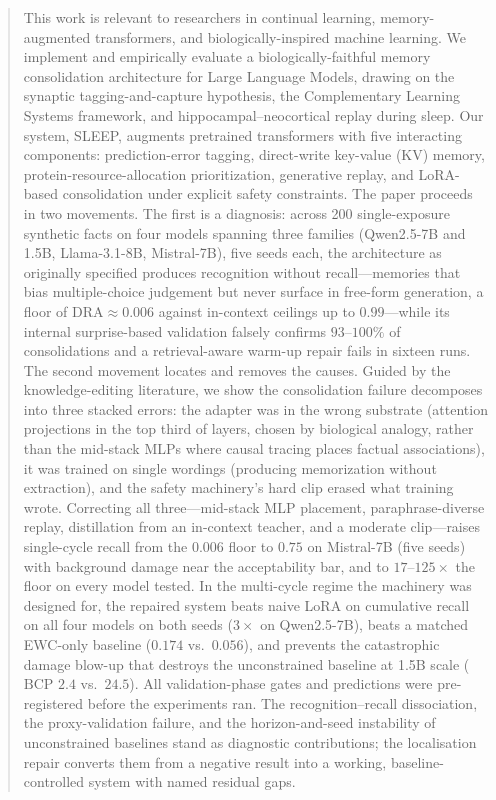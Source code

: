 
\begin{abstract}
This work is relevant to researchers in continual learning, memory-augmented transformers, and biologically-inspired machine learning. We implement and empirically evaluate a biologically-faithful memory consolidation architecture for Large Language Models, drawing on the synaptic tagging-and-capture hypothesis, the Complementary Learning Systems framework, and hippocampal--neocortical replay during sleep. Our system, SLEEP, augments pretrained transformers with five interacting components: prediction-error tagging, direct-write key-value (KV) memory, protein-resource-allocation prioritization, generative replay, and LoRA-based consolidation under explicit safety constraints. The paper proceeds in two movements. The first is a diagnosis: across 200 single-exposure synthetic facts on four models spanning three families (Qwen2.5-7B and 1.5B, Llama-3.1-8B, Mistral-7B), five seeds each, the architecture as originally specified produces recognition without recall---memories that bias multiple-choice judgement but never surface in free-form generation, a floor of $\mathrm{DRA} \approx 0.006$ against in-context ceilings up to $0.99$---while its internal surprise-based validation falsely confirms $93$--$100\%$ of consolidations and a retrieval-aware warm-up repair fails in sixteen runs. The second movement locates and removes the causes. Guided by the knowledge-editing literature, we show the consolidation failure decomposes into three stacked errors: the adapter was in the wrong substrate (attention projections in the top third of layers, chosen by biological analogy, rather than the mid-stack MLPs where causal tracing places factual associations), it was trained on single wordings (producing memorization without extraction), and the safety machinery's hard clip erased what training wrote. Correcting all three---mid-stack MLP placement, paraphrase-diverse replay, distillation from an in-context teacher, and a moderate clip---raises single-cycle recall from the $0.006$ floor to $0.75$ on Mistral-7B (five seeds) with background damage near the acceptability bar, and to $17$--$125\times$ the floor on every model tested. In the multi-cycle regime the machinery was designed for, the repaired system beats naive LoRA on cumulative recall on all four models on both seeds ($3\times$ on Qwen2.5-7B), beats a matched EWC-only baseline ($0.174$ vs.\ $0.056$), and prevents the catastrophic damage blow-up that destroys the unconstrained baseline at 1.5B scale ($\mathrm{BCP}$ $2.4$ vs.\ $24.5$). All validation-phase gates and predictions were pre-registered before the experiments ran. The recognition--recall dissociation, the proxy-validation failure, and the horizon-and-seed instability of unconstrained baselines stand as diagnostic contributions; the localisation repair converts them from a negative result into a working, baseline-controlled system with named residual gaps.

\end{abstract}
